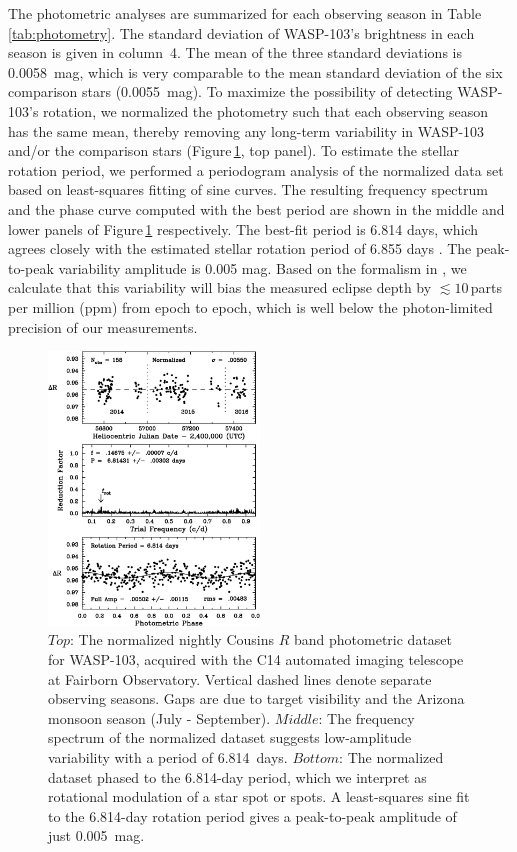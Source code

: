 \documentclass[twocolumn]{aastex61}
\begin{document}
The photometric analyses are summarized for each observing season in Table\,\ref{tab:photometry}.  The standard deviation of WASP-103's brightness in each season is given in column~4.  The mean of the three standard deviations is 0.0058~mag, which is very comparable to the mean standard deviation of the six comparison stars (0.0055~mag).  To maximize the possibility of detecting WASP-103's rotation, we normalized the photometry such that each observing season has the same mean, thereby removing any long-term variability in WASP-103 and/or the comparison stars (Figure\,\ref{fig:photometry}, top panel).  To estimate the stellar rotation period, we performed a periodogram analysis of the normalized data set based on least-squares fitting of sine curves.  The resulting frequency spectrum and the phase curve computed with the best period are shown in the middle and lower panels of Figure\,\ref{fig:photometry} respectively. The best-fit period is 6.814 days, which agrees closely with the estimated stellar rotation period of 6.855 days \citep[based on the projected stellar rotation velocity reported in][]{gillon14}. The peak-to-peak variability amplitude is 0.005 mag.  Based on the formalism in \cite{zellem17}, we calculate that this variability will bias the measured eclipse depth by $\lesssim10$\,parts per million (ppm) from epoch to epoch, which is well below the photon-limited precision of our measurements.

\begin{figure}
\includegraphics[width = 0.5\textwidth]{Figures/photometry.eps}
\caption{$Top$: The normalized nightly Cousins $R$ band photometric dataset for WASP-103, acquired with the C14 automated imaging telescope at Fairborn Observatory. Vertical dashed lines denote separate observing seasons. Gaps are due to target visibility and the Arizona monsoon season (July - September). $Middle$: The frequency spectrum of the normalized dataset suggests low-amplitude variability with a period of 6.814~days. $Bottom$: The normalized dataset phased to the 6.814-day period, which we interpret as rotational modulation of a star spot or spots. A least-squares sine fit to the 6.814-day rotation period gives a peak-to-peak amplitude of just 0.005~mag.}
\label{fig:photometry}
\end{figure}
\end{document}
